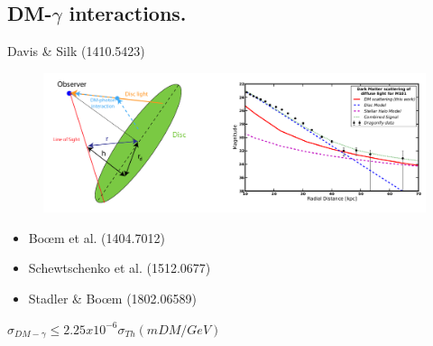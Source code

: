 \documentclass{beamer}
\begin{document}
\subsection{DM-$\gamma$ interactions.}
\frame{
\tableofcontents[ 
    currentsubsection, 
    sectionstyle=show/hide, 
    sectionstyle=show/shaded, 
    ] 
}

\begin{frame}
Davis \& Silk (1410.5423)
\begin{figure}[ht!]
 \centering
 \includegraphics[scale=0.15]{silk.png}
\end{figure}

 \begin{itemize}
  \item Bo{\oe}m et al. (1404.7012)
  \item Schewtschenko et al. (1512.0677)
  \item Stadler \& Bo{\oe}m (1802.06589)
 \end{itemize}
 
 $\sigma_{DM−\gamma} \leq 2.25x10^{-6}\sigma_{Th}(mDM/GeV) $
\end{frame}
\end{document}
